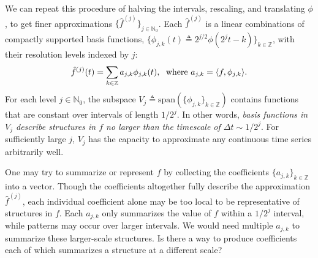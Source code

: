 \documentclass{article}
\def\defeq{\triangleq}
\newcommand{\inner}[2]{\langle{#1},{#2}\rangle}
\theoremstyle{plain}
\theoremstyle{definition}
\theoremstyle{remark}
\newcommand{\prepar}{\vspace{-0.1in}}
\begin{document}
We can repeat this procedure of halving the intervals, rescaling, and translating $\phi$, to get finer approximations $\{\hat f^{(j)}\}_{j\in \mathbb{N}_0}$.
Each $\hat f^{(j)}$ is a linear combinations of compactly supported basis functions,
$\{\phi_{j,k}(t) \triangleq 2^{j/2} \phi(2^j t - k)\}_{k\in \mathbb Z}$,
with their resolution levels indexed by $j$:
\begin{align*}
    \hat{f}^{(j)}(t) = \sum_{k \in \mathbb{Z}} a_{j,k} \phi_{j,k}(t), \text{\; where } a_{j,k} = \inner{f}{\phi_{j,k}}.  
\end{align*}
For each level $j \in \mathbb{N}_0$,  the subspace $V_j \defeq \mathrm{span}(\{\phi_{j,k}\}_{k\in \mathbb{Z}})$
contains functions that are constant over intervals of length $1/2^j$.
In other words, \emph{basis functions in $V_j$ describe structures in $f$ no larger than the timescale of $\Delta t \sim 1/2^j$}. For sufficiently large $j$, $V_j$ has the capacity to approximate any continuous time series arbitrarily well. 

One may try to summarize or represent $f$ by collecting the coefficients $\{a_{j,k}\}_{k\in \mathbb{Z}}$ into a vector.
Though the coefficients altogether fully describe the approximation $\hat{f}^{(j)}$, each individual coefficient alone may be too local to be representative of structures in $f$.
Each $a_{j,k}$ only summarizes the value of $f$ within a $1/2^j$ interval, while patterns may occur over larger intervals.
We would need multiple $a_{j,k}$ to summarize these larger-scale structures.
Is there a way to produce coefficients each of which summarizes a structure at a different scale?

\prepar
\end{document}
